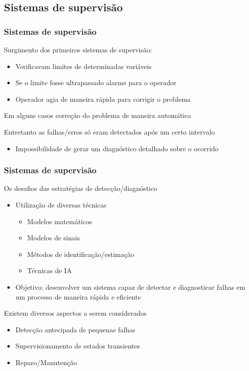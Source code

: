\documentclass{beamer}
\begin{document}
\subsection{Sistemas de supervisão}
\begin{frame}
    \frametitle{Sistemas de supervisão}

    Surgimento dos primeiros sistemas de supervisão:

\begin{itemize}
    \item Verificavam limites de determinadas variáveis
    \item Se o limite fosse ultrapassado \implica alarme para o operador
    \item Operador agia de maneira rápida para corrigir o problema
\end{itemize}

    Em alguns casos \implica correção do problema de maneira automática

    \vspace{0.25cm}

    Entretanto as falhas/erros só eram detectados após um certo intervalo

\begin{itemize}
    \item Impossibilidade de gerar um diagnóstico detalhado sobre o ocorrido
\end{itemize}

\end{frame}

\begin{frame}
    \frametitle{Sistemas de supervisão}

    Os desafios das estratégias de detecção/diagnóstico

\begin{itemize}
    \item Utilização de diversas técnicas
    \begin{itemize}
        \item Modelos matemáticos
        \item Modelos de sinais
        \item Métodos de identificação/estimação
        \item \alert{Técnicas de IA}
    \end{itemize}
    \item Objetivo: desenvolver um sistema capaz de detectar e diagnosticar
          falhas em um processo de maneira rápida e eficiente
\end{itemize}

Existem diversos aspectos a serem considerados

\begin{itemize}
    \item Detecção antecipada de pequenas falhas
    \item Supervisionamento de estados transientes
    \item Reparo/Manutenção
\end{itemize}
\end{frame}
\end{document}
